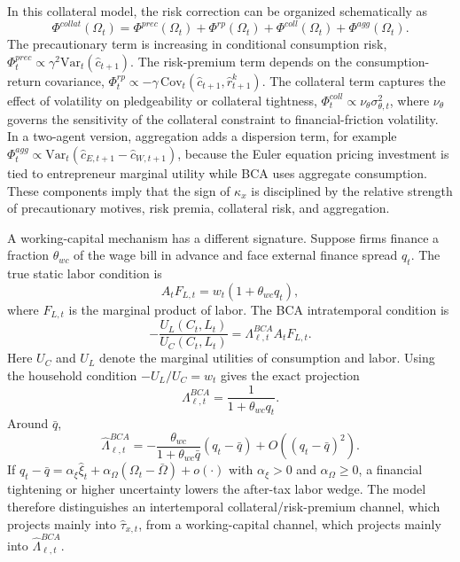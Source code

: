 \documentclass[12pt]{article}
\begin{document}
In this collateral model, the risk correction can be organized schematically as
\begin{equation}
\Phi^{collat}(\Omega_t)
=
\Phi^{prec}(\Omega_t)
+\Phi^{rp}(\Omega_t)
+\Phi^{coll}(\Omega_t)
+\Phi^{agg}(\Omega_t).
\label{app:fvgq-decomposition}
\end{equation}
The precautionary term is increasing in conditional consumption risk,
$\Phi^{prec}_t\propto \gamma^2 \mathrm{Var}_t(\hat c_{t+1})$. The risk-premium term depends
on the consumption-return covariance,
$\Phi^{rp}_t\propto -\gamma\,\mathrm{Cov}_t(\hat c_{t+1},\hat r^k_{t+1})$. The collateral
term captures the effect of volatility on pledgeability or collateral tightness,
$\Phi^{coll}_t\propto \nu_\theta\sigma_{\theta,t}^2$, where $\nu_\theta$ governs the sensitivity
of the collateral constraint to financial-friction volatility. In a two-agent version, aggregation
adds a dispersion term, for example
$\Phi^{agg}_t\propto \mathrm{Var}_t(\hat c_{E,t+1}-\hat c_{W,t+1})$, because the Euler
equation pricing investment is tied to entrepreneur marginal utility while BCA uses aggregate
consumption. These components imply that the sign of $\kappa_x$ is disciplined by the
relative strength of precautionary motives, risk premia, collateral risk, and aggregation.

A working-capital mechanism has a different signature. Suppose firms finance a fraction
$\theta_{wc}$ of the wage bill in advance and face external finance spread $q_t$. The true
static labor condition is
\begin{equation}
A_tF_{L,t}=w_t(1+\theta_{wc}q_t),
\label{app:wc-foc}
\end{equation}
where $F_{L,t}$ is the marginal product of labor. The BCA intratemporal condition is
\begin{equation}
-\frac{U_L(C_t,L_t)}{U_C(C_t,L_t)}
=
\Lambda_{\ell,t}^{BCA} A_tF_{L,t}.
\label{app:bca-labor}
\end{equation}
Here $U_C$ and $U_L$ denote the marginal utilities of consumption and labor.
Using the household condition $-U_L/U_C=w_t$ gives the exact projection
\begin{equation}
\Lambda_{\ell,t}^{BCA}
=
\frac{1}{1+\theta_{wc}q_t}.
\label{app:wc-projection}
\end{equation}
Around $\bar q$,
\begin{equation}
\hat{\Lambda}_{\ell,t}^{BCA}
=
-\frac{\theta_{wc}}{1+\theta_{wc}\bar q}(q_t-\bar q)
+O((q_t-\bar q)^2).
\label{app:wc-linear}
\end{equation}
If $q_t-\bar q=\alpha_\xi\hat\xi_t+\alpha_\Omega(\Omega_t-\bar{\Omega})+o(\cdot)$ with
$\alpha_\xi>0$ and $\alpha_\Omega\ge0$, a financial tightening or higher uncertainty lowers
the after-tax labor wedge. The model therefore distinguishes an intertemporal
collateral/risk-premium channel, which projects mainly into $\hat{\tau}_{x,t}$, from a
working-capital channel, which projects mainly into $\hat{\Lambda}_{\ell,t}^{BCA}$.

\newpage



\end{document}

